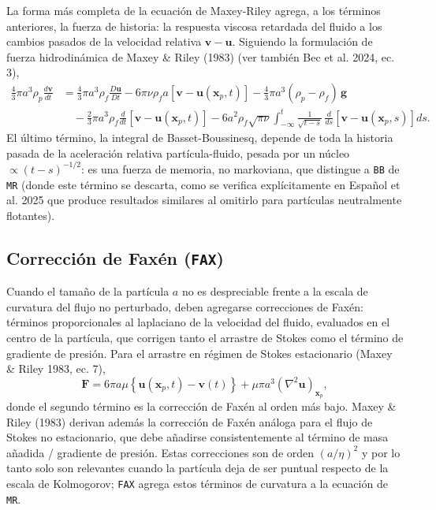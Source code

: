 \documentclass[11pt]{article}
\begin{document}
La forma más completa de la ecuación de Maxey-Riley agrega, a los
términos anteriores, la fuerza de historia: la respuesta viscosa retardada
del fluido a los cambios pasados de la velocidad relativa
$\mathbf{v}-\mathbf{u}$. Siguiendo la formulación de fuerza hidrodinámica
de Maxey \& Riley (1983) (ver también Bec et al. 2024, ec. 3),
\begin{align}
  \frac{4}{3}\pi a^3 \rho_p \frac{d\mathbf{v}}{dt}
  &= \frac{4}{3}\pi a^3 \rho_f \frac{D\mathbf{u}}{Dt}
  - 6\pi\nu\rho_f a\left[\mathbf{v}-\mathbf{u}(\mathbf{x}_p,t)\right]
  - \frac{4}{3}\pi a^3 (\rho_p-\rho_f)\,\mathbf{g} \nonumber\\
  &\quad - \frac{2}{3}\pi a^3 \rho_f \frac{d}{dt}\left[\mathbf{v}-\mathbf{u}(\mathbf{x}_p,t)\right]
  - 6a^2 \rho_f \sqrt{\pi\nu} \int_{-\infty}^{t}
    \frac{1}{\sqrt{t-s}}\,\frac{d}{ds}\left[\mathbf{v}-\mathbf{u}(\mathbf{x}_p,s)\right] ds.
  \label{eq:bb}
\end{align}
El último término, la integral de Basset-Boussinesq, depende de toda la
historia pasada de la aceleración relativa partícula-fluido, pesada por un
núcleo $\propto (t-s)^{-1/2}$: es una fuerza de memoria, no markoviana, que
distingue a \texttt{BB} de \texttt{MR} (donde este término se descarta,
como se verifica explícitamente en Español et al. 2025 que produce
resultados similares al omitirlo para partículas neutralmente flotantes).

\subsection{Corrección de Faxén (\texttt{FAX})}

Cuando el tamaño de la partícula $a$ no es despreciable frente a la escala
de curvatura del flujo no perturbado, deben agregarse correcciones de
Faxén: términos proporcionales al laplaciano de la velocidad del fluido,
evaluados en el centro de la partícula, que corrigen tanto el arrastre de
Stokes como el término de gradiente de presión. Para el arrastre en
régimen de Stokes estacionario (Maxey \& Riley 1983, ec. 7),
\begin{equation}
  \mathbf{F} = 6\pi a \mu \left\{\mathbf{u}(\mathbf{x}_p,t) - \mathbf{v}(t)\right\}
  + \mu\pi a^3 \left(\nabla^2 \mathbf{u}\right)_{\mathbf{x}_p},
\end{equation}
donde el segundo término es la corrección de Faxén al orden más bajo.
Maxey \& Riley (1983) derivan además la corrección de Faxén análoga para
el flujo de Stokes no estacionario, que debe añadirse consistentemente al
término de masa añadida / gradiente de presión. Estas correcciones son de
orden $(a/\eta)^2$ y por lo tanto solo son relevantes cuando la partícula
deja de ser puntual respecto de la escala de Kolmogorov; \texttt{FAX}
agrega estos términos de curvatura a la ecuación de \texttt{MR}.
\end{document}

